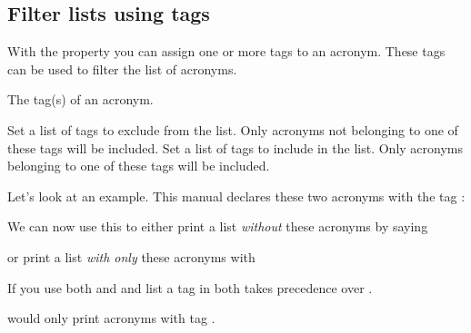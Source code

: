 \documentclass{acro-manual}
\begin{document}
\subsection{Filter lists using tags}\label{sec:lists-tags}
With the property  you can assign one or more tags to an
acronym.  These tags can be used to filter the list of acronyms.
\begin{properties}
  \Initial
    The tag(s) of an acronym.
\end{properties}
\begin{options}
  \Initial
    Set a list of tags to exclude from the list.  Only acronyms not
    belonging to one of these tags will be included.
  \Initial
    Set a list of tags to include in  the list.  Only acronyms belonging to
    one of these tags will be included.
\end{options}
  
Let's look at an example. This manual declares these two acronyms with the tag
:
\begin{sourcecode}
\end{sourcecode}
We can now use this to either print a list \emph{without} these acronyms by
saying
\begin{sourcecode}
  \printacronyms[exclude=city]
\end{sourcecode}
or print a list \emph{with only} these acronyms with
\begin{example}
  \printacronyms[include=city,heading=none]
\end{example}
\begin{bewareofthedog}
  If you use both  and  and list a tag in both
   takes precedence over .
  \begin{sourcecode}
  \printacronyms[exclude={a,b},include={b,c}]
  \end{sourcecode}
  would only print acronyms with tag .
\end{bewareofthedog}
\end{document}
